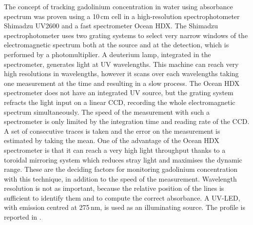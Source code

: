 \begin{figure}
	\begin{minipage}[t]{0.44\textwidth}
		\centering
		\raisebox{1.5em}{\resizebox{\linewidth}{!}{}}
		\label{fig:uv_led}
	\end{minipage}
	\hfill
	\begin{minipage}[t]{0.54\textwidth}
		\centering
		\resizebox{\textwidth}{!}{}
		\label{fig:gad_10cm}
	\end{minipage}
\end{figure}

The concept of tracking gadolinium concentration in water using absorbance spectrum %
was proven using a 10\,cm cell in a high-resolution spectrophotometer Shimadzu UV2600 %
and a fast spectrometer Ocean HDX.
The Shimadzu spectrophotometer uses two grating systems to select very narrow windows of the electromagnetic spectrum %
both at the source and at the detection, which is performed by a photomultiplier.
A deuterium lamp, integrated in the spectrometer, generates light at UV wavelengths.
This machine can reach very high resolutions in wavelengths, however it scans over each wavelengths %
taking one measurement at the time and resulting in a slow process.
The Ocean HDX spectrometer does not have an integrated UV source, %
but the grating system refracts the light input on a linear CCD, recording the whole %
electromagnetic spectrum simultaneously.
The speed of the measurement with such a spectrometer is only limited by the integration time %
and reading rate of the CCD.
A set of consecutive traces is taken and the error on the measurement is estimated by taking the mean.
One of the advantage of the Ocean HDX spectrometer is that it can reach a very high light throughput %
thanks to a toroidal mirroring system which reduces stray light and maximises the dynamic range.
These are the deciding factors for monitoring gadolinium concentration with this technique, %
in addition to the speed of the measurement.
Wavelength resolution is not as important, because the relative position of the lines is sufficient %
to identify them and to compute the correct absorbance.
A UV-LED, with emission centred at 275\,nm, is used as an illuminating source.
The profile is reported in .

